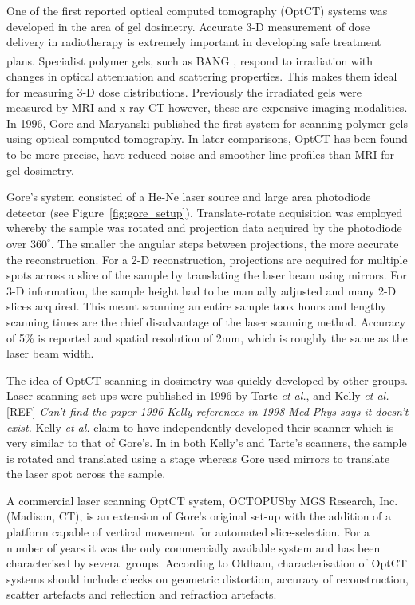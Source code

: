 \documentclass[12pt]{article}
\begin{document}
One of the first reported optical computed tomography (OptCT) systems was developed in the area of gel dosimetry. Accurate 3-D measurement of dose delivery in radiotherapy is extremely important in developing safe treatment plans. Specialist polymer gels, such as BANG\textsuperscript{\textregistered} \cite{Maryanski:1996}, respond to irradiation with changes in optical attenuation and scattering properties.  This makes them ideal for measuring 3-D dose distributions. Previously the irradiated gels were measured by MRI and x-ray CT however, these are expensive imaging modalities. In 1996, Gore and Maryanski published the first system for scanning polymer gels using optical computed tomography. \cite{Gore:1999tg} In later comparisons, OptCT has been found to be more precise, have reduced noise and smoother line profiles than MRI for gel dosimetry. \cite{Oldham:2001gs}

Gore's system consisted of a  He-Ne laser source and large area photodiode detector (see Figure~\ref{fig:gore_setup}). Translate-rotate acquisition was employed whereby the sample was rotated and projection data  acquired  by the photodiode over $360^{\circ}$. The smaller the angular steps between projections, the more accurate the reconstruction. \cite{russ2002image} For a 2-D reconstruction, projections are acquired for multiple spots across a slice of the sample by translating the laser beam using mirrors. For 3-D information, the sample height  had to be manually adjusted and many 2-D slices acquired. This meant scanning an entire sample took  hours and lengthy scanning times are the chief disadvantage of the laser scanning method.  Accuracy of 5\% is reported and spatial resolution of 2mm, which is roughly the same as the laser beam width. \cite{Gore:1999tg}

The idea of OptCT scanning in dosimetry was quickly developed by other groups. Laser scanning set-ups were published in 1996 by Tarte \textit{et al.},  \cite{Tarte:2006} and Kelly \textit{et al.} [REF]
\textit{Can't find the paper 1996 Kelly references in 1998 \cite{Kelly:1998} Med Phys says it doesn't exist.}
Kelly \textit{et al.} claim to have independently developed their scanner which is very similar to that of Gore's. In in both Kelly's and Tarte's  scanners, the sample is rotated and translated using a stage whereas Gore used mirrors to translate the laser spot across the sample. 


A commercial laser scanning OptCT system, OCTOPUS\texttrademark by MGS Research, Inc.
(Madison, CT),  is an extension of Gore's original set-up with the addition of a platform capable of vertical movement for automated slice-selection. \cite{Islam:2003gs} For a number of years it was the only commercially available system and has been characterised by several groups. \cite{Xu:2003cc, Islam:2003gs, Xu:2004iv, Sakhalkar:2009hb} According to Oldham, characterisation of OptCT systems should include checks on geometric distortion, accuracy of reconstruction, scatter artefacts and reflection and refraction artefacts.\cite{Oldham:2004cj}
\end{document}
